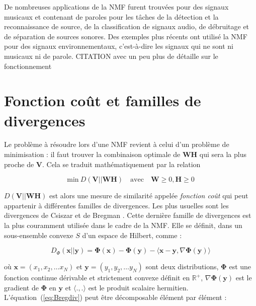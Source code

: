 De nombreuses applications de la NMF furent trouvées pour des signaux musicaux et contenant de paroles pour les tâches de la détection et la reconnaissance de source, de la classification de signaux audio, de débruitage et de séparation de sources sonores. Des exemples plus récents ont utilisé la NMF pour des signaux environnementaux, c'est-à-dire les signaux qui ne sont ni musicaux ni de parole. 
 CITATION avec un peu plus de détaille sur le fonctionnement

\section{Fonction coût et familles de divergences}

Le problème à résoudre lors d'une NMF revient à celui d'un problème de minimisation : il faut trouver la combinaison optimale de $\mathbf{WH}$ qui sera la plus proche de $\mathbf{V}$. Cela se traduit mathématiquement par la relation
 
\begin{equation}\label{eq:D(V-WH)}
\text{min}~D\left(\textbf{V} \vert\vert \textbf{WH}\right) \quad \text{avec} \quad \mathbf{W} \geq 0, \mathbf{H} \geq 0 
\end{equation}

$D\left(\textbf{V} \vert\vert \textbf{WH}\right)$ est alors une mesure de similarité appelée \textit{fonction coût} qui peut appartenir à différentes familles de divergences. Les plus usuelles sont les divergences de Csiszar \cite{cichocki2006csiszar} et de Bregman \cite{bregman_relaxation_1967} \cite{dhillon_generalized_2005}. Cette dernière famille de divergences est la plus couramment utilisée dans le cadre de la NMF. Elle se définit, dans un sous-ensemble convexe $S$ d'un espace de Hilbert, comme : 

\begin{equation}\label{eq:Bregdiv}
D_{\Phi}(\textbf{x}\vert\vert \textbf{y}) = 
\mathbf{\Phi}(\mathbf{x}) - \mathbf{\Phi}(\mathbf{y}) - 
\langle\mathbf{x}-\mathbf{y},\nabla\mathbf{\Phi}(\mathbf{y})\rangle
\end{equation}

où  $\mathbf{x} = (x_1, x_2, \dots x_N)$ et $\mathbf{y} = (y_1, y_2, \dots y_N)$ sont deux distributions, $\mathbf{\Phi}$ est une fonction continue dérivable et strictement convexe définit en $\mathbb{R}^+$, $\nabla\mathbf{\Phi}(\mathbf{y})$ est le gradient de $\mathbf{\Phi}$ en $\mathbf{y}$ et $\langle .,.\rangle$ est le produit scalaire hermitien. L'équation~(\ref{eq:Bregdiv}) peut être décomposable élément par élément : 

